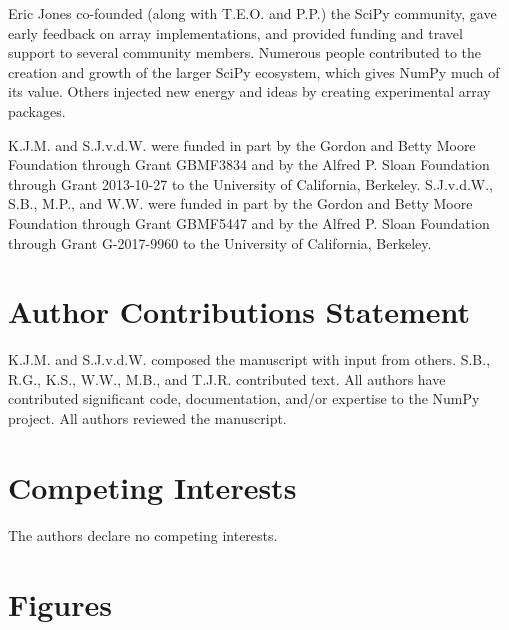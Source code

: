\documentclass[twocolumn]{article}
\begin{document}
Eric Jones co-founded (along with T.E.O. and P.P.) the SciPy community, gave early feedback on array
implementations, and provided funding and travel support to several
community members.
Numerous people contributed to the creation and
growth of the larger SciPy ecosystem, which gives NumPy much of its
value. Others injected new energy and ideas by creating experimental
array packages.

K.J.M. and S.J.v.d.W. were funded in part by the Gordon and Betty Moore
Foundation through Grant GBMF3834 and by the Alfred P. Sloan Foundation through
Grant 2013-10-27 to the University of California, Berkeley.
S.J.v.d.W., S.B., M.P., and W.W. were funded in part by the Gordon
and Betty Moore Foundation through Grant GBMF5447 and by the Alfred
P. Sloan Foundation through Grant G-2017-9960 to the University of
California, Berkeley.

\section*{Author Contributions Statement}

K.J.M. and S.J.v.d.W. composed the manuscript with input from others.
S.B., R.G., K.S., W.W., M.B., and T.J.R. contributed text.
All authors have contributed significant code, documentation, and/or expertise
to the NumPy project.
All authors reviewed the manuscript.

\section*{Competing Interests}

The authors declare no competing interests.

\section*{Figures}

\end{document}

